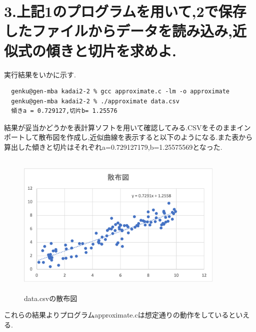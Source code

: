 \documentclass[a4j,10pt,dvipdfmx]{jarticle}
\begin{document}
\section{3.上記1のプログラムを用いて,2で保存したファイルからデータを読み込み,近似式の傾きと切片を求めよ.}
実行結果をいかに示す.
\begin{verbatim}
  genku@gen-mba kadai2-2 % gcc approximate.c -lm -o approximate  
  genku@gen-mba kadai2-2 % ./approximate data.csv
  傾きa = 0.729127,切片b= 1.25576
\end{verbatim}
結果が妥当かどうかを表計算ソフトを用いて確認してみる.CSVをそのままインポートして散布図を作成し,近似曲線を表示すると以下のようになる.また表から算出した傾きと切片はそれぞれa=0.729127179,b=1.25575569となった.
\begin{figure}[H]
  \begin{center}
  \includegraphics[height=7cm,width=10cm]{sanpuzu.png}
  \caption{data.csvの散布図}
\end{center}
\end{figure}
これらの結果よりプログラムapproximate.cは想定通りの動作をしているといえる.
\end{document}
